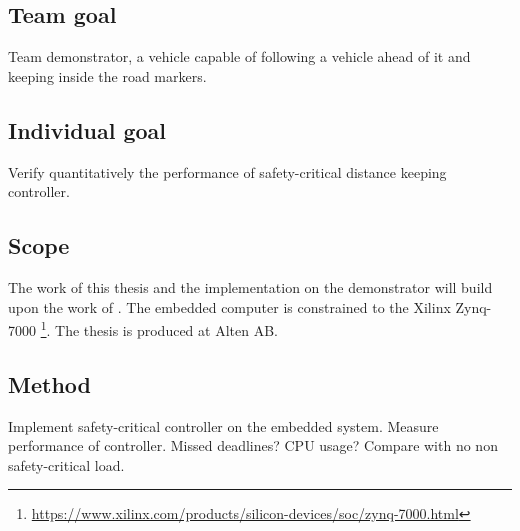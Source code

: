\subsection{Team goal}
Team demonstrator, a vehicle capable of following a vehicle ahead of it and keeping inside the road markers.

\subsection{Individual goal}
Verify quantitatively the performance of safety-critical distance keeping controller.

\subsection{Scope}
The work of this thesis and the implementation on the demonstrator will build upon the work of \cite{zaki2016}. The embedded computer is constrained to the Xilinx Zynq-7000 \footnote{\url{https://www.xilinx.com/products/silicon-devices/soc/zynq-7000.html}}.
The thesis is produced at Alten AB.

\subsection{Method}
Implement safety-critical controller on the embedded system. Measure performance of controller. Missed deadlines? CPU usage? Compare with no non safety-critical load.